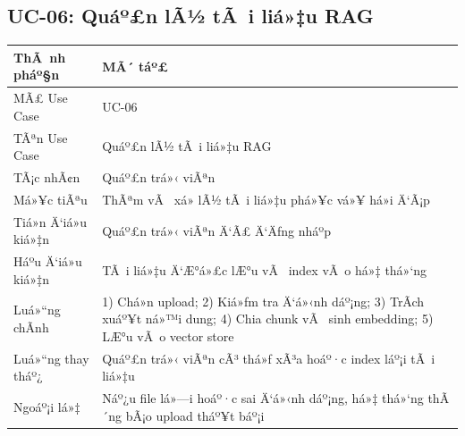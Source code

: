 ﻿\documentclass[12pt,a4paper]{report}
\begin{document}
\subsection{UC-06: Quáº£n lÃ½ tÃ i liá»‡u RAG}
\begin{table}[H]
\centering
\begin{tabular}{|p{3.5cm}|p{8.5cm}|}
\hline
\textbf{ThÃ nh pháº§n} & \textbf{MÃ´ táº£} \\ \hline
MÃ£ Use Case & UC-06 \\ \hline
TÃªn Use Case & Quáº£n lÃ½ tÃ i liá»‡u RAG \\ \hline
TÃ¡c nhÃ¢n & Quáº£n trá»‹ viÃªn \\ \hline
Má»¥c tiÃªu & ThÃªm vÃ  xá»­ lÃ½ tÃ i liá»‡u phá»¥c vá»¥ há»i Ä‘Ã¡p \\ \hline
Tiá»n Ä‘iá»u kiá»‡n & Quáº£n trá»‹ viÃªn Ä‘Ã£ Ä‘Äƒng nháº­p \\ \hline
Háº­u Ä‘iá»u kiá»‡n & TÃ i liá»‡u Ä‘Æ°á»£c lÆ°u vÃ  index vÃ o há»‡ thá»‘ng \\ \hline
Luá»“ng chÃ­nh & 1) Chá»n upload; 2) Kiá»ƒm tra Ä‘á»‹nh dáº¡ng; 3) TrÃ­ch xuáº¥t ná»™i dung; 4) Chia chunk vÃ  sinh embedding; 5) LÆ°u vÃ o vector store \\ \hline
Luá»“ng thay tháº¿ & Quáº£n trá»‹ viÃªn cÃ³ thá»ƒ xÃ³a hoáº·c index láº¡i tÃ i liá»‡u \\ \hline
Ngoáº¡i lá»‡ & Náº¿u file lá»—i hoáº·c sai Ä‘á»‹nh dáº¡ng, há»‡ thá»‘ng thÃ´ng bÃ¡o upload tháº¥t báº¡i \\ \hline
\end{tabular}
\end{table}
\end{document}
